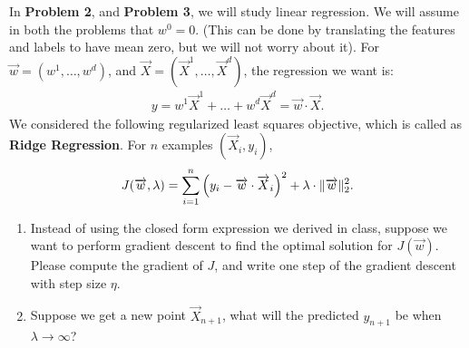 \documentclass[11pt]{article}
\newenvironment{problem}[2][Problem]{\begin{trivlist}
\item[\hskip \labelsep {\bfseries #1}\hskip \labelsep {\bfseries #2.}]}{\end{trivlist}}
\begin{document}
\noindent In \textbf{Problem 2}, and \textbf{Problem 3}, we will study linear regression. We will assume in both the problems that $w^0=0$. (This can be done by translating the features and labels to have mean zero, but we will not worry about it).  For $\overrightarrow w = (w^1, \ldots, w^d)$, and $\overrightarrow X = (\overrightarrow X^1, \ldots, \overrightarrow X^d)$, the regression we want is:
\begin{align}
y = w^1 \overrightarrow X^1+\ldots + w^d \overrightarrow X^d = \overrightarrow w\cdot \overrightarrow X.
\end{align}
We considered the following regularized least squares objective, which is called as \textbf{Ridge Regression}. For $n$ examples $(\overrightarrow X_i, y_i)$,  
\[
J(\overrightarrow w, \lambda) = \sum_{i=1}^n {\left({y_i -\overrightarrow w\cdot \overrightarrow X_i}\right)}^2 +\lambda \cdot \|\overrightarrow w\|_2^2.
\]	
 
\begin{problem}{2 (10 points) Gradient Descent for regression}\quad

\begin{enumerate}
\item 
Instead of using the closed form expression we derived in class, suppose we want to perform gradient descent to find the optimal solution for $J(\overrightarrow w)$. Please compute the gradient of $J$, and write one step of the gradient descent with step size $\eta$. 
\item
Suppose we get a new point $\overrightarrow X_{n+1}$, what will the predicted $y_{n+1}$ be when $\lambda\to\infty$? 
\end{enumerate}
\end{problem}
\end{document}
